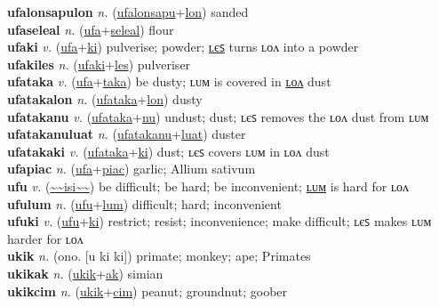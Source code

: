 \textbf{ufalonsapulon} \textit{n.} (\hyperref[ufalonsapu]{ufalonsapu}+\hyperref[lon]{lon})
sanded \label{ufalonsapulon} \\
\textbf{ufaseleal} \textit{n.} (\hyperref[ufa]{ufa}+\hyperref[seleal]{seleal})
flour \label{ufaseleal} \\
\textbf{ufaki} \textit{v.} (\hyperref[ufa]{ufa}+\hyperref[ki]{ki})
pulverise; powder; \hyperref[ufakiles]{ʟєꜱ} turns ʟᴏᴧ into a powder \label{ufaki} \\
\textbf{ufakiles} \textit{n.} (\hyperref[ufaki]{ufaki}+\hyperref[les]{les})
pulveriser \label{ufakiles} \\
\textbf{ufataka} \textit{v.} (\hyperref[ufa]{ufa}+\hyperref[taka]{taka})
be dusty; ʟᴜᴍ is covered in \hyperref[ufatakalon]{ʟᴏᴧ} dust \label{ufataka} \\
\textbf{ufatakalon} \textit{n.} (\hyperref[ufataka]{ufataka}+\hyperref[lon]{lon})
dusty \label{ufatakalon} \\
\textbf{ufatakanu} \textit{v.} (\hyperref[ufataka]{ufataka}+\hyperref[nu]{nu})
undust; dust; ʟєꜱ removes the ʟᴏᴧ dust from ʟᴜᴍ \label{ufatakanu} \\
\textbf{ufatakanuluat} \textit{n.} (\hyperref[ufatakanu]{ufatakanu}+\hyperref[luat]{luat})
duster \label{ufatakanuluat} \\
\textbf{ufatakaki} \textit{v.} (\hyperref[ufataka]{ufataka}+\hyperref[ki]{ki})
dust; ʟєꜱ covers ʟᴜᴍ in ʟᴏᴧ dust \label{ufatakaki} \\
\textbf{ufapiac} \textit{n.} (\hyperref[ufa]{ufa}+\hyperref[piac]{piac})
garlic; Allium sativum \label{ufapiac} \\
\textbf{ufu} \textit{v.} (\hyperref[isi]{\~{}\~{}isi\~{}\~{}})
be difficult; be hard; be inconvenient; \hyperref[ufulum]{ʟᴜᴍ} is hard for ʟᴏᴧ \label{ufu} \\
\textbf{ufulum} \textit{n.} (\hyperref[ufu]{ufu}+\hyperref[lum]{lum})
difficult; hard; inconvenient \label{ufulum} \\
\textbf{ufuki} \textit{v.} (\hyperref[ufu]{ufu}+\hyperref[ki]{ki})
restrict; resist; inconvenience; make difficult; ʟєꜱ makes ʟᴜᴍ harder for ʟᴏᴧ \label{ufuki} \\
\textbf{ukik} \textit{n.} (ono. [u ki ki])
primate; monkey; ape; Primates \label{ukik} \\
\textbf{ukikak} \textit{n.} (\hyperref[ukik]{ukik}+\hyperref[ak]{ak})
simian \label{ukikak} \\
\textbf{ukikcim} \textit{n.} (\hyperref[ukik]{ukik}+\hyperref[cim]{cim})
peanut; groundnut; goober \label{ukikcim} \\
